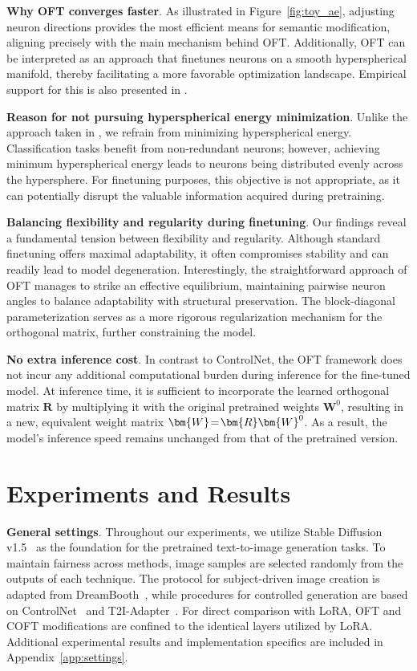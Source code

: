 \textbf{Why OFT converges faster}. As illustrated in Figure~\ref{fig:toy_ae}, adjusting neuron directions provides the most efficient means for semantic modification, aligning precisely with the main mechanism behind OFT. Additionally, OFT can be interpreted as an approach that finetunes neurons on a smooth hyperspherical manifold, thereby facilitating a more favorable optimization landscape. Empirical support for this is also presented in \cite{liu2021orthogonal}.

\textbf{Reason for not pursuing hyperspherical energy minimization}. Unlike the approach taken in \cite{liu2021orthogonal}, we refrain from minimizing hyperspherical energy. Classification tasks benefit from non-redundant neurons; however, achieving minimum hyperspherical energy leads to neurons being distributed evenly across the hypersphere. For finetuning purposes, this objective is not appropriate, as it can potentially disrupt the valuable information acquired during pretraining.

\textbf{Balancing flexibility and regularity during finetuning}. Our findings reveal a fundamental tension between flexibility and regularity. Although standard finetuning offers maximal adaptability, it often compromises stability and can readily lead to model degeneration. Interestingly, the straightforward approach of OFT manages to strike an effective equilibrium, maintaining pairwise neuron angles to balance adaptability with structural preservation. The block-diagonal parameterization serves as a more rigorous regularization mechanism for the orthogonal matrix, further constraining the model.

\textbf{No extra inference cost}. In contrast to ControlNet, the OFT framework does not incur any additional computational burden during inference for the fine-tuned model. At inference time, it is sufficient to incorporate the learned orthogonal matrix $\bm{R}$ by multiplying it with the original pretrained weights $\bm{W}^0$, resulting in a new, equivalent weight matrix $\thickmuskip=2mu \medmuskip=2mu \bm{W}=\bm{R}\bm{W}^0$. As a result, the model’s inference speed remains unchanged from that of the pretrained version.

\section{Experiments and Results}

\textbf{General settings}. Throughout our experiments, we utilize Stable Diffusion v1.5~\cite{rombach2022high} as the foundation for the pretrained text-to-image generation tasks. To maintain fairness across methods, image samples are selected randomly from the outputs of each technique. The protocol for subject-driven image creation is adapted from DreamBooth~\cite{ruiz2023dreambooth}, while procedures for controlled generation are based on ControlNet~\cite{zhang2023adding} and T2I-Adapter~\cite{mou2023t2i}. For direct comparison with LoRA, OFT and COFT modifications are confined to the identical layers utilized by LoRA. Additional experimental results and implementation specifics are included in Appendix~\ref{app:settings}.

